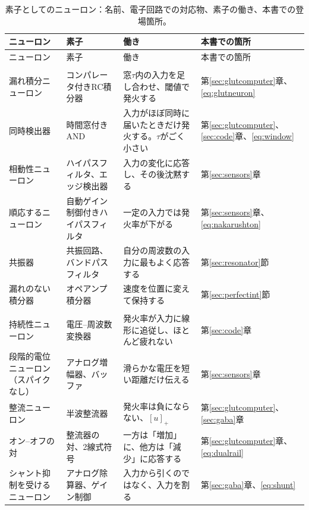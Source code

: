 \begin{center}
\footnotesize
\setlength{\tabcolsep}{3pt}
\renewcommand{\arraystretch}{1.15}
\begin{longtable}{>{\raggedright}p{3.1cm}>{\raggedright}p{3.3cm}>{\raggedright}p{4.7cm}>{\raggedright\arraybackslash}p{2.4cm}}
\caption{素子としてのニューロン：名前、電子回路での対応物、素子の働き、本書での登場箇所。}\label{tab:eetypes}\\
\toprule
ニューロン & 素子 & 働き & 本書での箇所 \\
\midrule
\endfirsthead
\toprule
ニューロン & 素子 & 働き & 本書での箇所 \\
\midrule
\endhead
\bottomrule
\endfoot
\multicolumn{4}{l}{\emph{フィルタと積分器}} \\
漏れ積分ニューロン & コンパレータ付きRC積分器 & 窓$\tau$内の入力を足し合わせ、閾値で発火する & 第\ref{sec:glutcomputer}章、\eqref{eq:glutneuron} \\
同時検出器 & 時間窓付きAND & 入力がほぼ同時に届いたときだけ発火する。$\tau$がごく小さい & 第\ref{sec:glutcomputer}、\ref{sec:code}章、\eqref{eq:window} \\
相動性ニューロン & ハイパスフィルタ、エッジ検出器 & 入力の変化に応答し、その後沈黙する & 第\ref{sec:sensors}章 \\
順応するニューロン & 自動ゲイン制御付きハイパスフィルタ & 一定の入力では発火率が下がる & 第\ref{sec:sensors}章、\eqref{eq:nakarushton} \\
共振器 & 共振回路、バンドパスフィルタ & 自分の周波数の入力に最もよく応答する & 第\ref{sec:resonator}節 \\
漏れのない積分器 & オペアンプ積分器 & 速度を位置に変えて保持する & 第\ref{sec:perfectint}節 \\
\midrule
\multicolumn{4}{l}{\emph{変換器}} \\
持続性ニューロン & 電圧--周波数変換器 & 発火率が入力に線形に追従し、ほとんど疲れない & 第\ref{sec:code}章 \\
段階的電位ニューロン（スパイクなし） & アナログ増幅器、バッファ & 滑らかな電圧を短い距離だけ伝える & 第\ref{sec:sensors}章 \\
整流ニューロン & 半波整流器 & 発火率は負にならない、$[u]_+$ & 第\ref{sec:glutcomputer}、\ref{sec:gaba}章 \\
オン--オフの対 & 整流器の対、2線式符号 & 一方は「増加」に、他方は「減少」に応答する & 第\ref{sec:glutcomputer}章、\eqref{eq:dualrail} \\
シャント抑制を受けるニューロン & アナログ除算器、ゲイン制御 & 入力から引くのではなく、入力を割る & 第\ref{sec:gaba}章、\eqref{eq:shunt} \\

\end{longtable}
\end{center}
